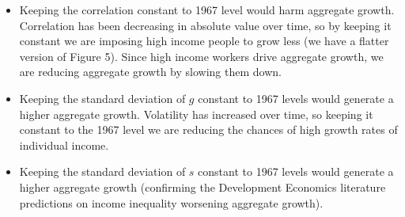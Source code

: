 \documentclass{article}
\begin{document}
\begin{figure}[H]
  \centering
  \hfill
  \caption*{}
\end{figure}

\begin{itemize}
    \item Keeping the correlation constant to 1967 level would harm aggregate growth. Correlation has been decreasing in absolute value over time, so by keeping it constant we are imposing high income people to grow less (we have a flatter version of Figure 5). Since high income workers drive aggregate growth, we are reducing aggregate growth by slowing them down.
    \item Keeping the standard deviation of $g$ constant to 1967 levels would generate a higher aggregate growth.
    Volatility has increased over time, so keeping it constant to the 1967 level we are reducing the chances of high growth rates of individual income. 
    \item Keeping the standard deviation of $s$ constant to 1967 levels would generate a higher aggregate growth (confirming the Development Economics literature predictions on income inequality worsening aggregate growth).
\end{itemize}
\end{document}
